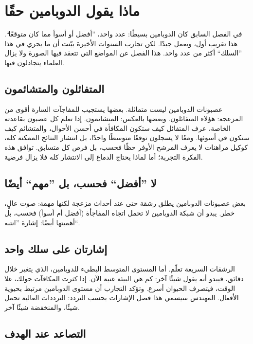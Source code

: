 \chapter{ماذا يقول الدوبامين حقًا}

في الفصل السابق كان الدوبامين بسيطًا: عدد واحد، ”أفضل أو أسوأ مما كان متوقعًا“. هذا تقريب أول، ويعمل جيدًا. لكن تجارب السنوات الأخيرة بيّنت أن ما يجري في هذا ”السلك“ أكثر من عدد واحد. هذا الفصل عن المواضع التي تتعقد فيها الصورة ولا يزال العلماء يتجادلون فيها.

\section*{المتفائلون والمتشائمون}

عصبونات الدوبامين ليست متماثلة. بعضها يستجيب للمفاجآت السارة أقوى من المزعجة: هؤلاء المتفائلون. وبعضها بالعكس: المتشائمون. إذا تعلم كل عصبون بقاعدته الخاصة، عرف المتفائل كيف ستكون المكافأة في أحسن الأحوال، والمتشائم كيف ستكون في أسوئها. ومعًا لا يسجلون توقعًا متوسطًا واحدًا، بل انتشار النتائج الممكنة كله، كوكيل مراهنات لا يعرف المرشح الأوفر حظًا فحسب، بل فرص كل متسابق. توافق هذه الفكرة التجربة؛ أما لماذا يحتاج الدماغ إلى الانتشار كله فلا يزال فرضية.


\section*{لا ”أفضل“ فحسب، بل ”مهم“ أيضًا}

بعض عصبونات الدوبامين يطلق رشقة حتى عند أحداث مزعجة لكنها مهمة: صوت عالٍ، خطر. يبدو أن شبكة الدوبامين لا تحمل اتجاه المفاجأة (أفضل أم أسوأ) فحسب، بل أهميتها أيضًا: إشارة ”انتبه“.

\section*{إشارتان على سلك واحد}

الرشقات السريعة تعلّم. أما المستوى المتوسط البطيء للدوبامين، الذي يتغير خلال دقائق، فيبدو أنه يقول شيئًا آخر: كم هي البيئة غنية الآن. إذا كثرت المكافآت حولك، غلا الوقت، فيتصرف الحيوان أسرع. وتؤكد التجارب أن مستوى الدوبامين مرتبط بحيوية الأفعال. المهندس سيسمي هذا فصل الإشارات بحسب التردد: الترددات العالية تحمل شيئًا، والمنخفضة شيئًا آخر.

\section*{التصاعد عند الهدف}

